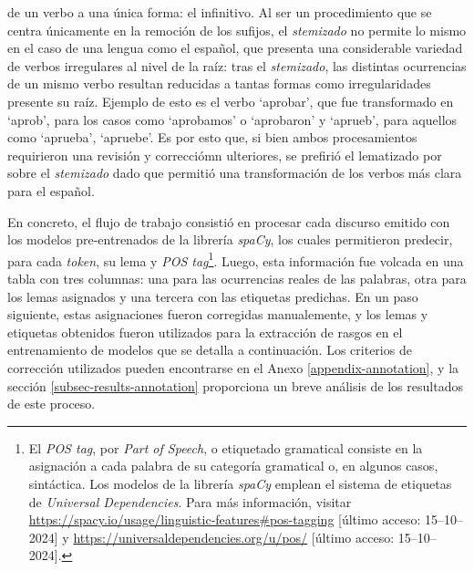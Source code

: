 de un verbo a una \'unica forma: el infinitivo. Al ser un procedimiento que se
centra \'unicamente en la remoci\'on de los sufijos, el \textit{stemizado} no permite
lo mismo en el caso de una lengua como el español, que presenta una considerable
variedad de verbos irregulares al nivel de la ra\'iz: tras el
\textit{stemizado}, las distintas ocurrencias de un mismo verbo resultan reducidas
a tantas formas como irregularidades presente su ra\'iz. Ejemplo de esto es el
verbo `aprobar', que fue transformado en `aprob', para los casos como
`aprobamos' o `aprobaron' y `aprueb', para aquellos como `aprueba',
`apruebe'. Es por esto que, si bien ambos procesamientos requirieron una revisi\'on
y correcci\'omn ulteriores, se prefiri\'o el lematizado por sobre el \textit{stemizado}
dado que permiti\'o una transformaci\'on de los verbos m\'as clara para el español.
\par
En concreto, el flujo de trabajo consisti\'o en procesar cada discurso emitido
con los modelos pre-entrenados de la librer\'ia \textit{spaCy}, los cuales permitieron
predecir, para cada \textit{token}, su lema y \textit{POS tag}\footnote{El
\textit{POS tag}, por \textit{Part of Speech}, o etiquetado gramatical consiste
en la asignaci\'on a cada palabra de su categor\'ia gramatical o, en algunos casos,
sint\'actica. Los modelos de la
librer\'ia \textit{spaCy} emplean el sistema de etiquetas de \textit{Universal Dependencies}.
Para m\'as informaci\'on, visitar
\url{https://spacy.io/usage/linguistic-features\#pos-tagging}
[\'ultimo acceso: 15--10--2024]
y \url{https://universaldependencies.org/u/pos/}
[\'ultimo acceso: 15--10--2024].}. Luego, esta
informaci\'on fue volcada en una tabla con tres columnas: una para las ocurrencias
reales de las palabras, otra para los lemas asignados y una tercera con las etiquetas predichas. En un paso siguiente, estas asignaciones fueron corregidas
manualemente, y los lemas y etiquetas obtenidos fueron utilizados para la
extracci\'on de rasgos en el entrenamiento de modelos que se detalla a continuaci\'on.
Los criterios de correcci\'on utilizados pueden encontrarse en el Anexo
\ref{appendix-annotation}, y la secci\'on \ref{subsec-results-annotation}
proporciona un breve an\'alisis de los resultados de este proceso.
